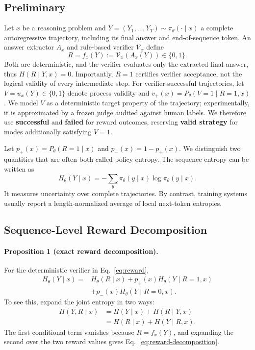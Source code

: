 \documentclass[letterpaper]{article} %
\begin{document}
\subsection{Preliminary}

Let \(x\) be a reasoning problem and \(Y=(Y_1,\ldots,Y_T)\sim\pi_\theta(\cdot\mid x)\) a complete autoregressive trajectory, including its final answer and end-of-sequence token. An answer extractor \(A_x\) and rule-based verifier \(\mathcal V_x\) define
\begin{equation}
    R=f_x(Y):=\mathcal V_x(A_x(Y))\in\{0,1\}.
    \label{eq:reward}
\end{equation}
Both are deterministic, and the verifier evaluates only the extracted final answer, thus \(H(R\mid Y,x)=0\). Importantly, \(R=1\) certifies verifier acceptance, not the logical validity of every intermediate step. For verifier-successful trajectories, let \(V=u_x(Y)\in\{0,1\}\) denote process validity and \(v_+(x)=P_\theta(V=1\mid R=1,x)\). We model \(V\) as a deterministic target property of the trajectory; experimentally, it is approximated by a frozen judge audited against human labels. We therefore use \textbf{successful} and \textbf{failed} for reward outcomes, reserving \textbf{valid strategy} for modes additionally satisfying \(V=1\).

Let \(p_+(x)=P_\theta(R=1\mid x)\) and \(p_-(x)=1-p_+(x)\). We distinguish two quantities that are often both called policy entropy. The sequence entropy can be written as
\begin{equation}
H_\theta(Y\mid x)=-\sum_y\pi_\theta(y\mid x)\log\pi_\theta(y\mid x).
\end{equation}
It measures uncertainty over complete trajectories. By contrast, training systems usually report a length-normalized average of local next-token entropies.

\subsection{Sequence-Level Reward Decomposition}

\paragraph{Proposition 1 (exact reward decomposition).}
For the deterministic verifier in Eq.~\eqref{eq:reward},
\begin{equation}
\begin{aligned}
H_\theta(Y\mid x)
={}&H_\theta(R\mid x)
+p_+(x)H_\theta(Y\mid R=1,x)\\
&+p_-(x)H_\theta(Y\mid R=0,x).
\end{aligned}
\label{eq:reward-decomposition}
\end{equation}
To see this, expand the joint entropy in two ways:
\begin{equation*}
\begin{aligned}
H(Y,R\mid x)
&=H(Y\mid x)+H(R\mid Y,x)\\
&=H(R\mid x)+H(Y\mid R,x).
\end{aligned}
\end{equation*}
The first conditional term vanishes because \(R=f_x(Y)\), and expanding the second over the two reward values gives Eq.~\eqref{eq:reward-decomposition}.
\end{document}
